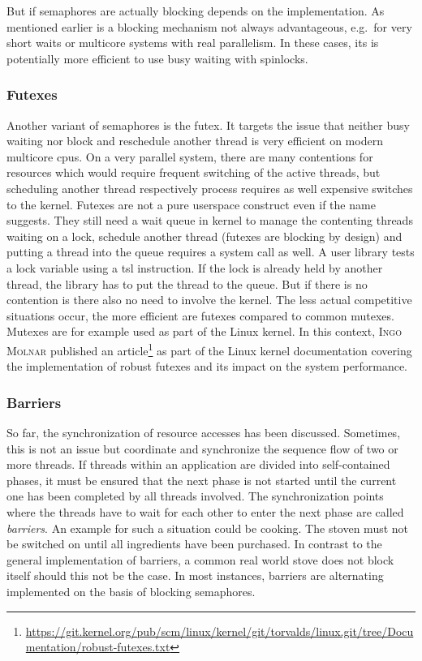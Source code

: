 But if semaphores are actually blocking depends on the implementation.
As mentioned earlier is a blocking mechanism not always advantageous, e.g.\ for very short waits or multicore systems with real parallelism.
In these cases, its is potentially more efficient to use busy waiting with spinlocks\cite{glatz2015betriebssysteme}.

\subsubsection*{Futexes}
Another variant of semaphores is the \ac{futex}. 
It targets the issue that neither busy waiting nor block and reschedule another thread is very efficient on modern multicore \acp{cpu}.
On a very parallel system, there are many contentions for resources which would require frequent switching of the active threads, but scheduling another thread respectively process requires as well expensive switches to the kernel\cite{tanenbaum-modern-operating-systems}.
Futexes are not a pure userspace construct even if the name suggests. 
They still need a wait queue in kernel to manage the contenting threads waiting on a lock, schedule another thread (futexes are blocking by design) and putting a thread into the queue requires a system call as well.
A user library tests a lock variable using a \ac{tsl} instruction.
If the lock is already held by another thread, the library has to put the thread to the queue.
But if there is no contention is there also no need to involve the kernel\cite{tanenbaum-modern-operating-systems}.
The less actual competitive situations occur, the more efficient are futexes compared to common mutexes.
Mutexes are for example used as part of the Linux kernel. 
In this context, \textsc{Ingo Molnar} published an article\footnote{\url{https://git.kernel.org/pub/scm/linux/kernel/git/torvalds/linux.git/tree/Documentation/robust-futexes.txt}} as part of the Linux kernel documentation covering the implementation of robust futexes and its impact on the system performance.

\subsubsection*{Barriers}
So far, the synchronization of resource accesses has been discussed.
Sometimes, this is not an issue but coordinate and synchronize the sequence flow of two or more threads.
If threads within an application are divided into self-contained phases, it must be ensured that the next phase is not started until the current one has been completed by all threads involved\cite{tanenbaum-modern-operating-systems}.
The synchronization points where the threads have to wait for each other to enter the next phase are called \textit{barriers}.
An example for such a situation could be cooking.
The stoven must not be switched on until all ingredients have been purchased.
In contrast to the general implementation of barriers, a common real world stove does not block itself should this not be the case.
In most instances, barriers are alternating implemented on the basis of blocking semaphores\cite{glatz2015betriebssysteme}.



